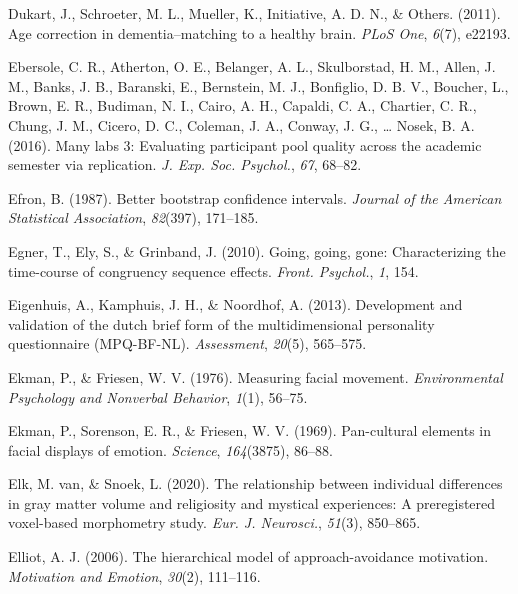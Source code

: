 \documentclass[11pt,american,a4paper,oneside,]{memoir} %
\begin{document}
\leavevmode\hypertarget{ref-Dukart2011-aq}{}%
Dukart, J., Schroeter, M. L., Mueller, K., Initiative, A. D. N., \& Others. (2011). Age correction in dementia--matching to a healthy brain. \emph{PLoS One}, \emph{6}(7), e22193.

\leavevmode\hypertarget{ref-Ebersole2016-cr}{}%
Ebersole, C. R., Atherton, O. E., Belanger, A. L., Skulborstad, H. M., Allen, J. M., Banks, J. B., Baranski, E., Bernstein, M. J., Bonfiglio, D. B. V., Boucher, L., Brown, E. R., Budiman, N. I., Cairo, A. H., Capaldi, C. A., Chartier, C. R., Chung, J. M., Cicero, D. C., Coleman, J. A., Conway, J. G., \ldots{} Nosek, B. A. (2016). Many labs 3: Evaluating participant pool quality across the academic semester via replication. \emph{J. Exp. Soc. Psychol.}, \emph{67}, 68--82.

\leavevmode\hypertarget{ref-efron1987better}{}%
Efron, B. (1987). Better bootstrap confidence intervals. \emph{Journal of the American Statistical Association}, \emph{82}(397), 171--185.

\leavevmode\hypertarget{ref-Egner2010-ot}{}%
Egner, T., Ely, S., \& Grinband, J. (2010). Going, going, gone: Characterizing the time-course of congruency sequence effects. \emph{Front. Psychol.}, \emph{1}, 154.

\leavevmode\hypertarget{ref-Eigenhuis2013-xo}{}%
Eigenhuis, A., Kamphuis, J. H., \& Noordhof, A. (2013). Development and validation of the dutch brief form of the multidimensional personality questionnaire (MPQ-BF-NL). \emph{Assessment}, \emph{20}(5), 565--575.

\leavevmode\hypertarget{ref-Ekman1976-hm}{}%
Ekman, P., \& Friesen, W. V. (1976). Measuring facial movement. \emph{Environmental Psychology and Nonverbal Behavior}, \emph{1}(1), 56--75.

\leavevmode\hypertarget{ref-Ekman1969-pu}{}%
Ekman, P., Sorenson, E. R., \& Friesen, W. V. (1969). Pan-cultural elements in facial displays of emotion. \emph{Science}, \emph{164}(3875), 86--88.

\leavevmode\hypertarget{ref-Van_Elk2020-xo}{}%
Elk, M. van, \& Snoek, L. (2020). The relationship between individual differences in gray matter volume and religiosity and mystical experiences: A preregistered voxel-based morphometry study. \emph{Eur. J. Neurosci.}, \emph{51}(3), 850--865.

\leavevmode\hypertarget{ref-elliot2006hierarchical}{}%
Elliot, A. J. (2006). The hierarchical model of approach-avoidance motivation. \emph{Motivation and Emotion}, \emph{30}(2), 111--116.
\end{document}
